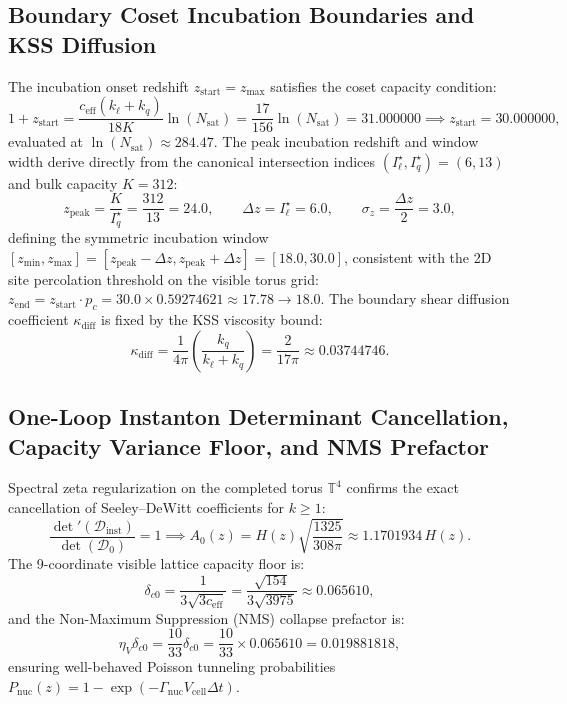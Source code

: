 \documentclass[11pt]{article}
\theoremstyle{plain}
\begin{document}
\subsection{Boundary Coset Incubation Boundaries and KSS Diffusion}
The incubation onset redshift $z_{\mathrm{start}} = z_{\mathrm{max}}$ satisfies the coset capacity condition:
\begin{equation}
1 + z_{\mathrm{start}} = \frac{c_{\mathrm{eff}}(k_\ell + k_q)}{18 K} \ln(N_{\mathrm{sat}}) = \frac{17}{156} \ln(N_{\mathrm{sat}}) = 31.000000 \implies z_{\mathrm{start}} = 30.000000,
\end{equation}
evaluated at $\ln(N_{\mathrm{sat}}) \approx 284.47$. The peak incubation redshift and window width derive directly from the canonical intersection indices $(I_\ell^\star, I_q^\star) = (6, 13)$ and bulk capacity $K = 312$:
\begin{equation}
z_{\mathrm{peak}} = \frac{K}{I_q^\star} = \frac{312}{13} = 24.0, \qquad \Delta z = I_\ell^\star = 6.0, \qquad \sigma_z = \frac{\Delta z}{2} = 3.0,
\end{equation}
defining the symmetric incubation window $[z_{\mathrm{min}}, z_{\mathrm{max}}] = [z_{\mathrm{peak}} - \Delta z, z_{\mathrm{peak}} + \Delta z] = [18.0, 30.0]$, consistent with the 2D site percolation threshold on the visible torus grid: $z_{\mathrm{end}} = z_{\mathrm{start}} \cdot p_c = 30.0 \times 0.59274621 \approx 17.78 \to 18.0$.
The boundary shear diffusion coefficient $\kappa_{\mathrm{diff}}$ is fixed by the KSS viscosity bound:
\begin{equation}
\kappa_{\mathrm{diff}} = \frac{1}{4\pi} \left(\frac{k_q}{k_\ell + k_q}\right) = \frac{2}{17\pi} \approx 0.03744746.
\end{equation}

\subsection{One-Loop Instanton Determinant Cancellation, Capacity Variance Floor, and NMS Prefactor}
Spectral zeta regularization on the completed torus $\mathbb{T}^4$ confirms the exact cancellation of Seeley--DeWitt coefficients for $k \ge 1$:
\begin{equation}
\frac{{\det}'(\mathcal{D}_{\mathrm{inst}})}{\det(\mathcal{D}_0)} = 1 \implies A_0(z) = H(z) \sqrt{\frac{1325}{308\pi}} \approx 1.1701934 \, H(z).
\end{equation}
The 9-coordinate visible lattice capacity floor is:
\begin{equation}
\delta_{c0} = \frac{1}{3\sqrt{3 c_{\mathrm{eff}}}} = \frac{\sqrt{154}}{3\sqrt{3975}} \approx 0.065610,
\end{equation}
and the Non-Maximum Suppression (NMS) collapse prefactor is:
\begin{equation}
\eta_V \delta_{c0} = \frac{10}{33} \delta_{c0} = \frac{10}{33} \times 0.065610 = 0.019881818,
\end{equation}
ensuring well-behaved Poisson tunneling probabilities $P_{\mathrm{nuc}}(z) = 1 - \exp(-\Gamma_{\mathrm{nuc}} V_{\mathrm{cell}} \Delta t)$.
\end{document}
